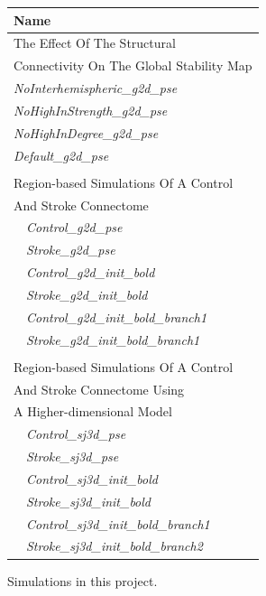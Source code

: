 \documentclass{tufte-handout}
\begin{document}
\begin{margintable}
  \centering
  \selectfont
  \begin{tabular}{l}
    \toprule
    Name           \\
    \midrule
    \multicolumn{1}{l}{The Effect Of The Structural}\\
    \multicolumn{1}{l}{Connectivity On The Global Stability Map}\\
    \textit{NoInterhemispheric\_g2d\_pse}\\
    \textit{NoHighInStrength\_g2d\_pse}\\
    \textit{NoHighInDegree\_g2d\_pse}\\
    \textit{Default\_g2d\_pse}\\
     \\
	\multicolumn{1}{l}{Region-based Simulations Of A Control }\\
    \multicolumn{1}{l}{And Stroke Connectome}\\

    $\quad$\textit{Control\_g2d\_pse}           \\
    $\quad$\textit{Stroke\_g2d\_pse}             \\
    $\quad$\textit{Control\_g2d\_init\_bold} \\
    $\quad$\textit{Stroke\_g2d\_init\_bold}        \\  
    $\quad$\textit{Control\_g2d\_init\_bold\_branch1}           \\
    $\quad$\textit{Stroke\_g2d\_init\_bold\_branch1} \\ 
    \\
    \multicolumn{1}{l}{Region-based Simulations Of A Control  }\\
    \multicolumn{1}{l}{And Stroke Connectome Using}\\
    \multicolumn{1}{l}{A Higher-dimensional Model}\\
    $\quad$\textit{Control\_sj3d\_pse}\\
    $\quad$\textit{Stroke\_sj3d\_pse}\\
    $\quad$\textit{Control\_sj3d\_init\_bold}\\
    $\quad$\textit{Stroke\_sj3d\_init\_bold}\\
    $\quad$\textit{Control\_sj3d\_init\_bold\_branch1}\\
    $\quad$\textit{Stroke\_sj3d\_init\_bold\_branch2}\\
    \bottomrule
  \end{tabular}
  \caption{Simulations in this project.}
  \label{tab:normaltab}
\end{margintable}
\end{document}

